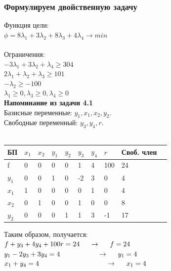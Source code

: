 \documentclass[14pt,a4paper,fleqn]{extarticle}
\begin{document}
\subsubsection*{Формулируем двойственную задачу}
Функция цели:\\
$\phi = 8\lambda_1 + 3\lambda_2 + 8\lambda_3 + 4\lambda_4 \longrightarrow min$\\\\
Ограничения:\\
$-3\lambda_1 + 3\lambda_2 + \lambda_4 \geq 304$\\
$2\lambda_1 + \lambda_2 + \lambda_3 \geq 101$\\
$-\lambda_2 \geq -100$\\
$\lambda_1 \geq 0, \lambda_3 \geq 0, \lambda_4 \geq 0$
\newpage
\noindent\makebox[\linewidth]{\rule{\paperwidth}{0.4pt}}\\
\textbf{Напоминание из задачи 4.1}\\
Базисные переменные: $y_1, x_1, x_2, y_2$.\\
Свободные переменный: $y_3, y_4, r$.\\\\
\begin{tabularx}{\textwidth}{|p{1cm}|p{1cm}|p{1cm}|p{1cm}|p{1cm}|p{1cm}|p{1cm}|p{1cm}|p{1.2cm}|c}
	\hline
	БП & $x_1$ & $x_2$ & $y_1$ & $y_2$ & $y_3$ & $y_4$ & $r$ & Своб. член & \\
	\hline
	f & 0 & 0 & 0 & 0 & 1 & 4 & 100 & 24 & \\
	\hline
	$y_1$ & 0 & 0 & 1 & 0 & -2 & 3 & 0 & 4 & \\
	\hline
	$x_1$ & 1 & 0 & 0 & 0 & 0 & 1 & 0 & 4\\
	\hline
	$x_2$ & 0 & 1 & 0 & 0 & 1 & 0 & 0 & 8 \\
	\hline
	$y_2$ & 0 & 0 & 0 & 1 & 1 & 3 & -1 & 17\\
	\hline
\end{tabularx}
\newline\newline
Таким образом, получается:\\
$f + y_3 + 4y_4 + 100r = 24 \hspace*{0.5cm} \rightarrow \hspace*{0.5cm} f = 24$\\
$y_1 - 2y_3 + 3y_4 = 4 \hspace*{1.9cm} \rightarrow \hspace*{0.5cm} y_1 = 4$\\
$x_1 + y_4 = 4 \hspace*{3.4cm} \rightarrow \hspace*{0.5cm} x_1 = 4$\\
\end{document}
